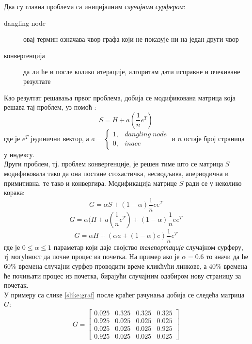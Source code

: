 \documentclass[11pt, serbianc, english, titlepage]{article}
\begin{document}
        Два су главна проблема са иницијалним \emph{случајним сурфером}:
        \begin{description}
        \item[dangling node] овај термин означава чвор графа који не показује ни на један други чвор
        \item[конвергенција] да ли ће и после колико итерације, алгоритам дати исправне и очекиване резултате
        \end{description}
        Као резултат решавања првог проблема, добија се модификована матрица која решава тај проблем, уз помоћ :
        \begin{equation}
        S = H + a(\frac{1}{n}e^{T})
        \end{equation}
        где је $e^T$ јединични вектор, а $a = \left\{\begin{matrix}
1, & dangling\; node \\ 
0, & inace
\end{matrix}\right.$ и $n$ остаје број страница у индексу.\\
        Други проблем, тј. проблем конвергенције, је решен тиме што се матрица $S$ модификовала тако да она постане стохастичка, несводљива, апериодична и примитивна, те тако и конвергира. Модификација матрице $S$ ради се у неколико корака: 
        \begin{equation}
        G = \alpha S + (1-\alpha)\frac{1}{n}ee^{T}
        \end{equation}
        \begin{equation}
        G = \alpha(H + a(\frac{1}{n}e^{T})+(1-\alpha)\frac{1}{n}ee^{T}
        \end{equation}
        \begin{equation}
        G = \alpha H + (\alpha a + (1-\alpha)e)\frac{1}{n}e^{T}
        \end{equation}
        где је $0\leqslant\alpha\leqslant1$ параметар који даје својство \emph{телепортације} случајном сурферу, тј могућност да почне процес из почетка. На пример ако је $\alpha=0.6$ то значи да ће 60\% времена случајни сурфер проводити време кликћући линкове, а 40\% времена ће почињати процес из почетка, бирајући случајним одабиром нову страницу за почетак.\\
        У примеру са слике \ref{slike:graf} после краћег рачунања добија се следећа матрица $G$:
\[G = 
\begin{bmatrix}
0.025 & 0.325 & 0.325 & 0.325 \\ 
0.925 & 0.025 & 0.025 & 0.025 \\ 
0.025 & 0.025 & 0.025 & 0.925 \\ 
0.925 & 0.025 & 0.025 & 0.025
\end{bmatrix}
\]
\pagebreak
\end{document}
